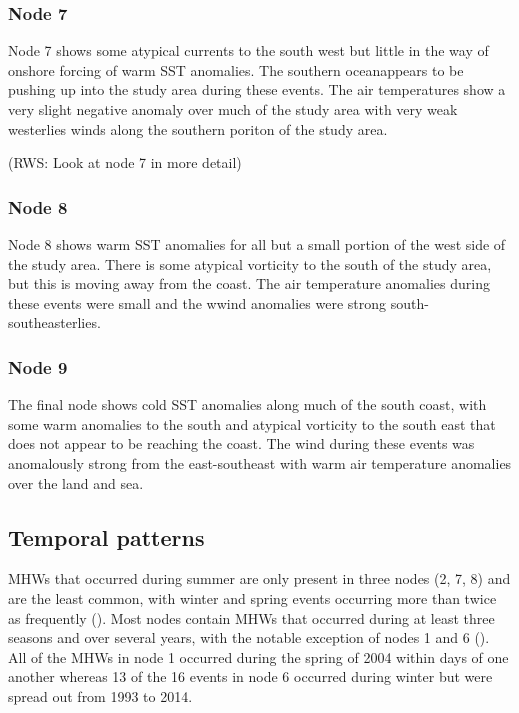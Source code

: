 \documentclass[a4paper,10pt,review]{elsarticle}
\begin{document}
\subsubsection{Node 7}
Node 7 shows some atypical currents to the south west but little in the way of onshore forcing of warm SST anomalies. The southern oceanappears to be pushing up into the study area during these events. The air temperatures show a very slight negative anomaly over much of the study area with very weak westerlies winds along the southern poriton of the study area.

(RWS: Look at node 7 in more detail)

\subsubsection{Node 8}
Node 8 shows warm SST anomalies for all but a small portion of the west side of the study area. There is some atypical vorticity to the south of the study area, but this is moving away from the coast. The air temperature anomalies during these events were small and the wwind anomalies were strong south-southeasterlies. 

\subsubsection{Node 9}
The final node shows cold SST anomalies along much of the south coast, with some warm anomalies to the south and atypical vorticity to the south east that does not appear to be reaching the coast. The wind during these events was anomalously strong from the east-southeast with warm air temperature anomalies over the land and sea.

\subsection{Temporal patterns}
MHWs that occurred during summer are only present in three nodes (2, 7, 8) and are the least common, with winter and spring events occurring more than twice as frequently (). Most nodes contain MHWs that occurred during at least three seasons and over several years, with the notable exception of nodes 1 and 6 (). All of the MHWs in node 1 occurred during the spring of 2004 within days of one another whereas 13 of the 16 events in node 6 occurred during winter but were spread out from 1993 to 2014.
\end{document}
